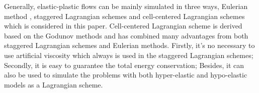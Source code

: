 \documentclass{article}
\numberwithin{equation}{section}
\numberwithin{table}{section}
\begin{document}
Generally, elastic-plastic flows can be mainly simulated in three ways, Eulerian method \cite{trangenstein1991higher,miller2001high,barton2009exact}, staggered Lagrangian schemes \cite{wilkins1963calculation} and cell-centered Lagrangian schemes \cite{burton2013cell,kluth2010discretization,maire2013nominally,cheng2017third} which is considered in this paper.
Cell-centered Lagrangian  scheme  is derived  based on the Godunov methods and has combined many advantages from both staggered Lagrangian schemes and Eulerian methods. Firstly, it's no necessary to use artificial viscosity  which always is used in the staggered Lagrangian schemes; Secondly, it is easy to guarantee the total energy conservation; Besides, it can also be used to simulate the problems with both  hyper-elastic and hypo-elastic models  \cite{burton2013cell,kluth2010discretization,maire2013nominally,cheng2017third}  as a Lagrangian scheme.
\end{document}
